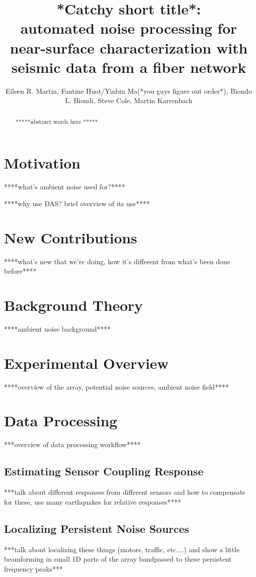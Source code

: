 \documentclass[11pt]{amsart}
\title{*Catchy short title*: \\
automated noise processing for near-surface characterization with seismic data from a fiber network}
\author{Eileen R. Martin, Fantine Huot/Yinbin Ma(*you guys figure out order*), Biondo L. Biondi, Steve Cole, Martin Karrenbach}
\begin{document}
\maketitle

\begin{abstract} 
*****abstract words here *****
\end{abstract}


\section*{Motivation}
****what's ambient noise used for?****

****why use DAS? brief overview of its use****



\section*{New Contributions}
****what's new that we're doing, how it's different from what's been done before****



\section*{Background Theory}
****ambient noise background****



\section*{Experimental Overview}
****overview of the array, potential noise sources, ambient noise field****



\section*{Data Processing}
***overview of data processing workflow****

\subsection*{Estimating Sensor Coupling Response}
***talk about different responses from different sensors and how to compensate for these, use many earthquakes for relative responses****

\subsection*{Localizing Persistent Noise Sources}
***talk about localizing these things (motors, traffic, etc....) and show a little beamforming in small 1D parts of the array bandpassed to these persistent frequency peaks***
\end{document}
